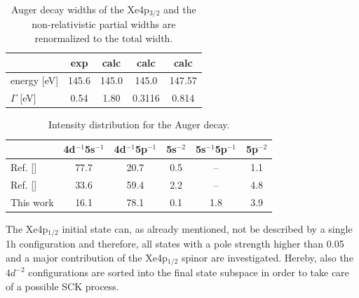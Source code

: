 \begin{table}[h]
 \centering
 \caption{Auger decay widths of the Xe4p$_{3/2}$ and the non-relativistic
          partial widths are renormalized to the total width.}
 \begin{tabular}{lcccc}
   \toprule
                        & exp   & calc\footnotemark[1] & calc\footnotemark[2] & calc\footnotemark[3] \\
   \midrule                                                                         
   energy [\unit{eV}]   & 145.6 &  145.0       &  145.0       &   147.57   \\
   $\Gamma$ [\unit{eV}] &  0.54 &  1.80        &  0.3116      &  0.814\\
   \bottomrule
 \end{tabular}
 \label{table:xe_auger_comp}
\end{table}


\begin{table}[h]
  \centering
  \caption{Intensity distribution for the Auger decay.}
  \begin{tabular}{lccccc}
   \toprule
                   & 4d$^{-1}$5s$^{-1}$ & 4d$^{-1}$5p$^{-1}$ & 5s$^{-2}$ & 5s$^{-1}$5p$^{-1}$ & 5p$^{-2}$ \\
   \midrule
   Ref. [\cite{Heinaesmaeki04}]\footnotemark[1] & 77.7 & 20.7  &       0.5 &       --           & 1.1     \\
   Ref. [\cite{Heinaesmaeki04}]\footnotemark[2] & 33.6 & 59.4  &       2.2 &       --           & 4.8     \\
   This work       &      16.1          &       78.1         &    0.1    &     1.8            & 3.9    \\
   \bottomrule
  \end{tabular}
  \label{table:Xe_auger_distr}
\end{table}


The Xe4p$_{1/2}$ initial state can, as already mentioned, not be described
by a single 1h configuration and therefore, all states with a pole strength
higher than 0.05 and a major contribution of the Xe4p$_{1/2}$ spinor are
investigated. Hereby, also the $4d^{-2}$ configurations are sorted into the
final state subspace in order to take care of a possible \ac{SCK} process.

